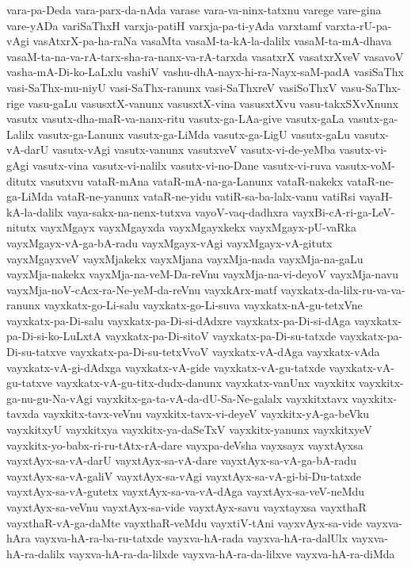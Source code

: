 {vara-pa-Deda
vara-parx-da-nAda
varase
vara-va-ninx-tatxnu
varege
vare-gina
vare-yADa
variSaThxH
varxja-patiH
varxja-pa-ti-yAda
varxtamf
varxta-rU-pa-vAgi
vasAtxrX-pa-ha-raNa
vasaMta
vasaM-ta-kA-la-dalilx
vasaM-ta-mA-dhava
vasaM-ta-na-va-rA-tarx-sha-ra-nanx-va-rA-tarxda
vasatxrX
vasatxrXveV
vasavoV
vasha-mA-Di-ko-LaLxlu
vashiV
vashu-dhA-nayx-hi-ra-Nayx-saM-padA
vasiSaThx
vasi-SaThx-mu-niyU
vasi-SaThx-ranunx
vasi-SaThxreV
vasiSoThxV
vasu-SaThx-rige
vasu-gaLu
vasusxtX-vanunx
vasusxtX-vina
vasusxtXvu
vasu-takxSXvXnunx
vasutx
vasutx-dha-maR-va-nanx-ritu
vasutx-ga-LAa-give
vasutx-gaLa
vasutx-ga-Lalilx
vasutx-ga-Lanunx
vasutx-ga-LiMda
vasutx-ga-LigU
vasutx-gaLu
vasutx-vA-darU
vasutx-vAgi
vasutx-vanunx
vasutxveV
vasutx-vi-de-yeMba
vasutx-vi-gAgi
vasutx-vina
vasutx-vi-nalilx
vasutx-vi-no-Dane
vasutx-vi-ruva
vasutx-voM-ditutx
vasutxvu
vataR-mAna
vataR-mA-na-ga-Lanunx
vataR-nakekx
vataR-ne-ga-LiMda
vataR-ne-yanunx
vataR-ne-yidu
vatiR-sa-ba-lalx-vanu
vatiRsi
vayaH-kA-la-dalilx
vaya-sakx-na-nenx-tutxva
vayoV-vaq-dadhxra
vayxBi-cA-ri-ga-LeV-nitutx
vayxMgayx
vayxMgayxda
vayxMgayxkekx
vayxMgayx-pU-vaRka
vayxMgayx-vA-ga-bA-radu
vayxMgayx-vAgi
vayxMgayx-vA-gitutx
vayxMgayxveV
vayxMjakekx
vayxMjana
vayxMja-nada
vayxMja-na-gaLu
vayxMja-nakekx
vayxMja-na-veM-Da-reVnu
vayxMja-na-vi-deyoV
vayxMja-navu
vayxMja-noV-cAcx-ra-Ne-yeM-da-reVnu
vayxkArx-matf
vayxkatx-da-lilx-ru-va-va-ranunx
vayxkatx-go-Li-salu
vayxkatx-go-Li-suva
vayxkatx-nA-gu-tetxVne
vayxkatx-pa-Di-salu
vayxkatx-pa-Di-si-dAdxre
vayxkatx-pa-Di-si-dAga
vayxkatx-pa-Di-si-ko-LuLxtA
vayxkatx-pa-Di-sitoV
vayxkatx-pa-Di-su-tatxde
vayxkatx-pa-Di-su-tatxve
vayxkatx-pa-Di-su-tetxVvoV
vayxkatx-vA-dAga
vayxkatx-vAda
vayxkatx-vA-gi-dAdxga
vayxkatx-vA-gide
vayxkatx-vA-gu-tatxde
vayxkatx-vA-gu-tatxve
vayxkatx-vA-gu-titx-dudx-danunx
vayxkatx-vanUnx
vayxkitx
vayxkitx-ga-nu-gu-Na-vAgi
vayxkitx-ga-ta-vA-da-dU-Sa-Ne-galalx
vayxkitxtavx
vayxkitx-tavxda
vayxkitx-tavx-veVnu
vayxkitx-tavx-vi-deyeV
vayxkitx-yA-ga-beVku
vayxkitxyU
vayxkitxya
vayxkitx-ya-daSeTxV
vayxkitx-yanunx
vayxkitxyeV
vayxkitx-yo-babx-ri-ru-tAtx-rA-dare
vayxpa-deVsha
vayxsayx
vayxtAyxsa
vayxtAyx-sa-vA-darU
vayxtAyx-sa-vA-dare
vayxtAyx-sa-vA-ga-bA-radu
vayxtAyx-sa-vA-galiV
vayxtAyx-sa-vAgi
vayxtAyx-sa-vA-gi-bi-Du-tatxde
vayxtAyx-sa-vA-gutetx
vayxtAyx-sa-va-vA-dAga
vayxtAyx-sa-veV-neMdu
vayxtAyx-sa-veVnu
vayxtAyx-sa-vide
vayxtAyx-savu
vayxtayxsa
vayxthaR
vayxthaR-vA-ga-daMte
vayxthaR-veMdu
vayxtiV-tAni
vayxvAyx-sa-vide
vayxva-hAra
vayxva-hA-ra-ba-ru-tatxde
vayxva-hA-rada
vayxva-hA-ra-dalUlx
vayxva-hA-ra-dalilx
vayxva-hA-ra-da-lilxde
vayxva-hA-ra-da-lilxve
vayxva-hA-ra-diMda
}
